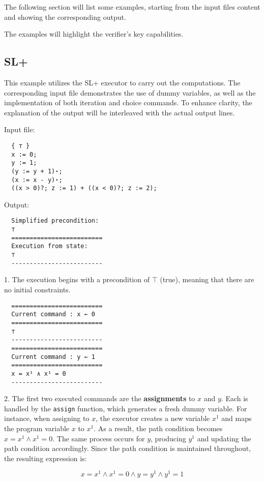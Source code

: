 \documentclass[parskip=half]{scrartcl}
\begin{document}
The following section will list some examples, starting from the input files content and showing the corresponding output.

The examples will highlight the verifier's key capabilities.  

\subsection{SL+}
This example utilizes the SL+ executor to carry out the computations. The corresponding input file demonstrates the use of dummy variables, as well as the implementation of both iteration and choice commands. To enhance clarity, the explanation of the output will be interleaved with the actual output lines.

Input file: 
\begin{verbatim} 
  { ⊤ }
  x := 0;
  y := 1;
  (y := y + 1)⋆;
  (x := x - y)⋆;
  ((x > 0)?; z := 1) + ((x < 0)?; z := 2);
\end{verbatim}

Output: 
\begin{verbatim} 
  Simplified precondition:              
  ⊤
  =========================
  Execution from state:
  ⊤
  -------------------------
\end{verbatim}
1. The execution begins with a precondition of $\top$ (true), meaning that there are no initial constraints.

\begin{verbatim}
  =========================
  Current command : x ← 0
  =========================
  ⊤
  -------------------------
  =========================
  Current command : y ← 1
  =========================
  x = x¹ ∧ x¹ = 0
  -------------------------
\end{verbatim}
2. The first two executed commands are the \textbf{assignments} to $x$ and $y$. Each is handled by the \texttt{assign} function, which generates a fresh dummy variable. For instance, when assigning to $x$, the executor creates a new variable $x^1$ and maps the program variable $x$ to $x^1$. As a result, the path condition becomes $x = x^1 \land x^1 = 0$. The same process occurs for $y$, producing $y^1$ and updating the path condition accordingly. Since the path condition is maintained throughout, the resulting expression is:

$$
x = x^1 \land x^1 = 0 \land y = y^1 \land y^1 = 1
$$
\end{document}
